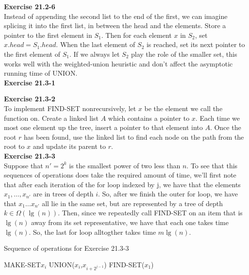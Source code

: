 \documentclass{article}
\begin{document}
\noindent\textbf{Exercise 21.2-6}\\

Instead of appending the second list to the end of the first, we can imagine splicing it into the first list, in between the head and the elements.  Store a pointer to the first element in $S_1$.  Then for each element $x$ in $S_2$, set $x.head = S_1.head$.  When the last element of $S_2$ is reached, set its next pointer to the first element of $S_1$.  If we always let $S_2$ play the role of the smaller set, this works well with the weighted-union heuristic and don't affect the asymptotic running time of UNION. \\

\noindent\textbf{Exercise 21.3-1}\\


\noindent\textbf{Exercise 21.3-2}\\

To implement FIND-SET nonrecursively, let $x$ be the element we call the function on.  Create a linked list $A$ which contains a pointer to $x$.  Each time we most one element up the tree, insert a pointer to that element into $A$.  Once the root $r$ has been found, use the linked list to find each node on the path from the root to $x$ and update its parent to $r$.  \\

\noindent\textbf{Exercise 21.3-3}\\

Suppose that $n' =2^k$ is the smallest power of two less than $n$. To see that this sequences of operations does take the required amount of time, we'll first note that after each iteration of the for loop indexed by j, we have that the elements $x_1,\ldots,x_{n'}$ are in trees of depth $i$. So, after we finish the outer for loop, we have that $x_1 \ldots x_{n'}$ all lie in the same set, but are represented by a tree of depth $k\in \Omega(\lg(n))$. Then, since we repeatedly call FIND-SET on an item that is $\lg(n)$ away from its set representative, we have that each one takes time $\lg(n)$. So, the last for loop alltogther takes time $m\lg(n)$.\\
\begin{algorithm}
\caption{Sequence of operations for Exercise 21.3-3}
\begin{algorithmic}
\State MAKE-SET{$x_i$}
\EndFor
{}
\State UNION($x_i$,$x_{i+2^{j-1}}$)
\EndFor
\EndFor
{}
\State FIND-SET($x_1$)
\EndFor
\end{algorithmic}
\end{algorithm}
\end{document}
